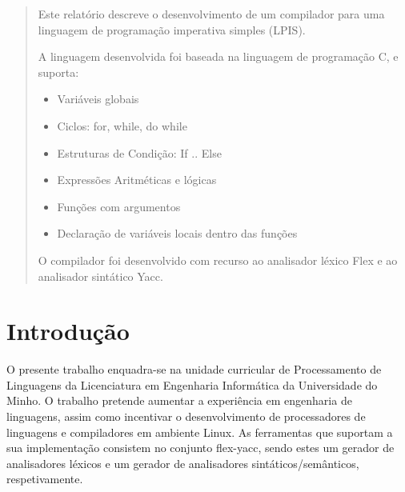 \documentclass[a4paper,10pt]{report}
\begin{document}


\begin{abstract}
Este relatório descreve o desenvolvimento de um compilador para uma linguagem de programação imperativa simples (LPIS). 

A linguagem desenvolvida foi baseada na linguagem de programação C, e suporta:
\begin{itemize}
  \item Variáveis globais
  \item Ciclos: for, while, do while
  \item Estruturas de Condição: If .. Else
  \item Expressões Aritméticas e lógicas
  \item Funções com argumentos
  \item Declaração de variáveis locais dentro das funções
\end{itemize}
O compilador foi desenvolvido com recurso ao analisador léxico Flex e ao analisador sintático Yacc.

\end{abstract}
\tableofcontents
{}


\chapter{Introdução}
\label{cap:intro}
O presente trabalho enquadra-se na unidade curricular de Processamento de Linguagens da Licenciatura em Engenharia Informática da Universidade do Minho. O trabalho pretende aumentar a experiência em engenharia de linguagens, assim como incentivar o desenvolvimento de processadores de linguagens e compiladores em ambiente Linux. As ferramentas que suportam a sua implementação consistem no conjunto flex-yacc, sendo estes um gerador de analisadores léxicos e um gerador de analisadores sintáticos/semânticos, respetivamente. 
\end{document}
